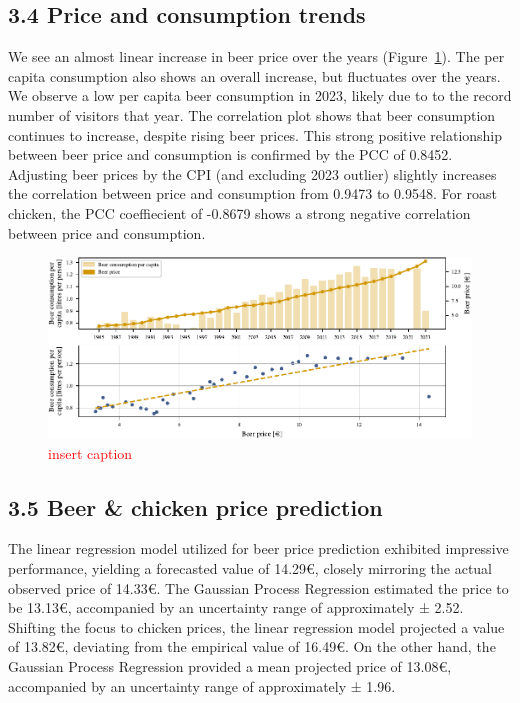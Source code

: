 \documentclass{article}
\theoremstyle{plain}
\theoremstyle{definition}
\theoremstyle{remark}
\begin{document}
\subsection*{3.4 Price and consumption trends}
We see an almost linear increase in beer price over the years (Figure~\ref{fig:beer_consumption}). The per capita consumption also shows an overall increase, but fluctuates over the years. We observe a low per capita beer consumption in 2023, likely due to to the record number of visitors that year. The correlation plot shows that beer consumption continues to increase, despite rising beer prices. This strong positive relationship between beer price and consumption is confirmed by the PCC of 0.8452.
Adjusting beer prices by the CPI (and excluding 2023 outlier) slightly increases the correlation between price and consumption from 0.9473  to 0.9548. For roast chicken, the PCC coeffiecient of -0.8679 shows a strong negative correlation between price and consumption.
\begin{figure}[ht] %
\includegraphics{doc/fig/beer_consumption.pdf} %
\caption{\textcolor{red}{insert caption}}
\label{fig:beer_consumption}
\end{figure}
\subsection*{3.5 Beer \& chicken price prediction}
The linear regression model utilized for beer price prediction exhibited impressive performance, yielding a forecasted value of 14.29€, closely mirroring the actual observed price of 14.33€. The Gaussian Process Regression estimated the price to be 13.13€, accompanied by an uncertainty range of approximately ± 2.52.
Shifting the focus to chicken prices, the linear regression model projected a value of 13.82€, deviating from the empirical value of 16.49€. On the other hand, the Gaussian Process Regression provided a mean projected price of 13.08€, accompanied by an uncertainty range of approximately ± 1.96.
\end{document}
